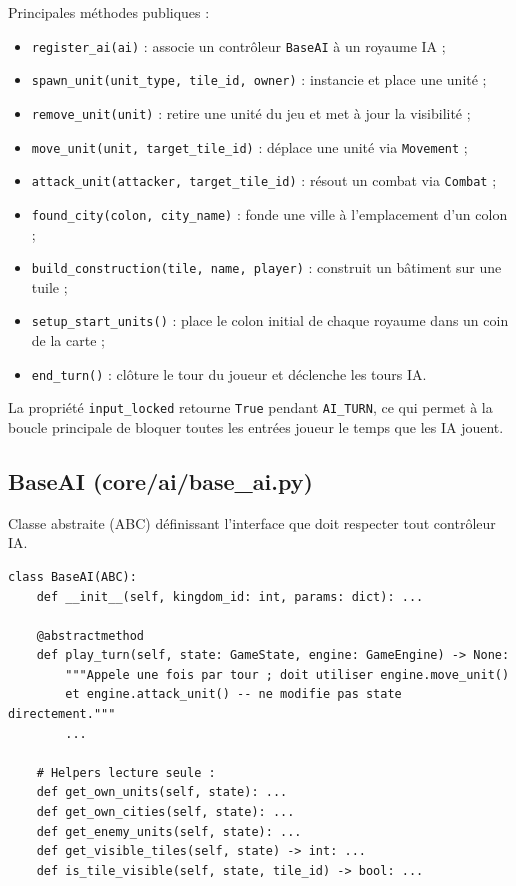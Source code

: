\documentclass[12pt, a4paper]{article}
\begin{document}
Principales méthodes publiques :
\begin{itemize}
    \item \texttt{register\_ai(ai)} : associe un contrôleur \texttt{BaseAI} à un royaume IA ;
    \item \texttt{spawn\_unit(unit\_type, tile\_id, owner)} : instancie et place une unité ;
    \item \texttt{remove\_unit(unit)} : retire une unité du jeu et met à jour la visibilité ;
    \item \texttt{move\_unit(unit, target\_tile\_id)} : déplace une unité via \texttt{Movement} ;
    \item \texttt{attack\_unit(attacker, target\_tile\_id)} : résout un combat via \texttt{Combat} ;
    \item \texttt{found\_city(colon, city\_name)} : fonde une ville à l'emplacement d'un colon ;
    \item \texttt{build\_construction(tile, name, player)} : construit un bâtiment sur une tuile ;
    \item \texttt{setup\_start\_units()} : place le colon initial de chaque royaume dans un coin de la carte ;
    \item \texttt{end\_turn()} : clôture le tour du joueur et déclenche les tours IA.
\end{itemize}

La propriété \texttt{input\_locked} retourne \texttt{True} pendant \texttt{AI\_TURN},
ce qui permet à la boucle principale de bloquer toutes les entrées joueur le temps que
les IA jouent.

\subsection{BaseAI (core/ai/base\_ai.py)}

Classe abstraite (ABC) définissant l'interface que doit respecter tout contrôleur IA.

\begin{lstlisting}[style=python, caption={Interface abstraite \texttt{BaseAI}}]
class BaseAI(ABC):
    def __init__(self, kingdom_id: int, params: dict): ...

    @abstractmethod
    def play_turn(self, state: GameState, engine: GameEngine) -> None:
        """Appele une fois par tour ; doit utiliser engine.move_unit()
        et engine.attack_unit() -- ne modifie pas state directement."""
        ...

    # Helpers lecture seule :
    def get_own_units(self, state): ...
    def get_own_cities(self, state): ...
    def get_enemy_units(self, state): ...
    def get_visible_tiles(self, state) -> int: ...
    def is_tile_visible(self, state, tile_id) -> bool: ...
\end{lstlisting}
\end{document}
